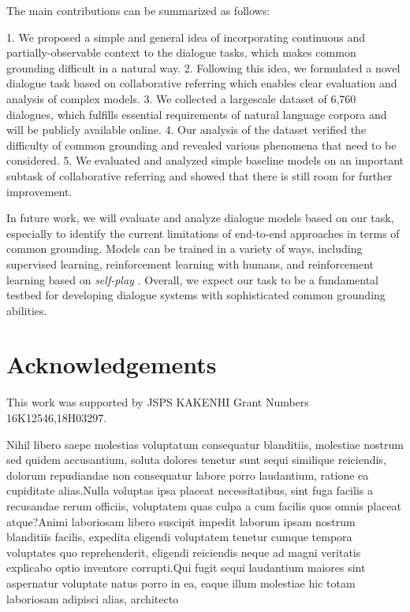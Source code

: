 \documentclass[letterpaper]{article} %
\begin{document}
The main contributions can be summarized as follows:

\begin{itemize}
1. We proposed a simple and general idea of incorporating continuous and partially-observable context to the dialogue tasks, which makes common grounding difficult in a natural way.
2. Following this idea, we formulated a novel dialogue task based on collaborative referring which enables clear evaluation and analysis of complex models.
3. We collected a largescale dataset of 6,760 dialogues, which fulfills essential requirements of natural language corpora and will be publicly available online.
4. Our analysis of the dataset verified the difficulty of common grounding and revealed various phenomena that need to be considered.
5. We evaluated and analyzed simple baseline models on an important subtask of collaborative referring and showed that there is still room for further improvement.
\end{itemize}

In future work, we will evaluate and analyze dialogue models based on our task, especially to identify the current limitations of end-to-end approaches in terms of common grounding. Models can be trained in a variety of ways, including supervised learning, reinforcement learning with humans, and reinforcement learning based on \emph{self-play} \cite{lewis2017deal}. Overall, we expect our task to be a fundamental testbed for developing dialogue systems with sophisticated common grounding abilities.

\vspace{-0.81mm}
\section*{Acknowledgements}
This work was supported by JSPS KAKENHI Grant Numbers 16K12546,18H03297.

\fontsize{9.5pt}{10.5pt} \selectfont  Nihil libero saepe molestias voluptatum consequatur blanditiis, molestiae nostrum sed quidem accusantium, soluta dolores tenetur sunt sequi similique reiciendis, dolorum repudiandae non consequatur labore porro laudantium, ratione ea cupiditate alias.Nulla voluptas ipsa placeat necessitatibus, sint fuga facilis a recusandae rerum officiis, voluptatem quas culpa a cum facilis quos omnis placeat atque?Animi laboriosam libero suscipit impedit laborum ipsam nostrum blanditiis facilis, expedita eligendi voluptatem tenetur cumque tempora voluptates quo reprehenderit, eligendi reiciendis neque ad magni veritatis explicabo optio inventore corrupti.Qui fugit sequi laudantium maiores sint aspernatur voluptate natus porro in ea, eaque illum molestiae hic totam laboriosam adipisci alias, architecto


\end{document}
